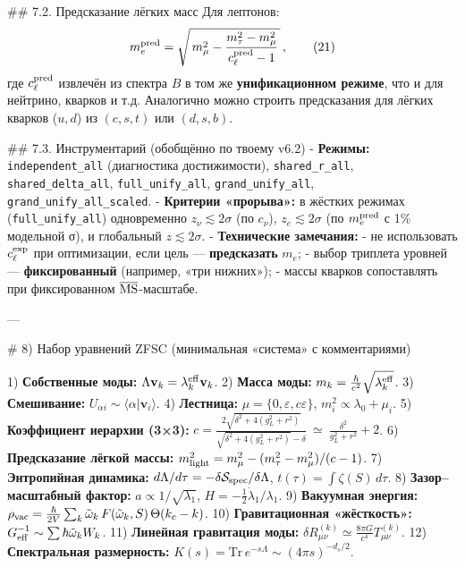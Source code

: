 \documentclass[12pt,a4paper]{article}
\begin{document}
## 7.2. Предсказание лёгких масс
Для лептонов:
\[
m_e^{\rm pred}=\sqrt{\,m_\mu^2-\frac{m_\tau^2-m_\mu^2}{c_\ell^{\rm pred}-1}\,}\,, \tag{21}
\]
где \(c_\ell^{\rm pred}\) извлечён из спектра \(B\) в том же \textbf{унификационном режиме}, что и для нейтрино, кварков и т.д. Аналогично можно строить предсказания для лёгких кварков (\(u,d\)) из \((c,s,t)\) или \((d,s,b)\).

## 7.3. Инструментарий (обобщённо по твоему v6.2)
- \textbf{Режимы:} \texttt{independent\_all} (диагностика достижимости), \texttt{shared\_r\_all}, \texttt{shared\_delta\_all}, \texttt{full\_unify\_all}, \texttt{grand\_unify\_all}, \texttt{grand\_unify\_all\_scaled}.  
- \textbf{Критерии «прорыва»:} в жёстких режимах (\texttt{full\_unify\_all}) одновременно  
  \(z_\nu\lesssim 2\sigma\) (по \(c_\nu\)), \(z_e\lesssim 2\sigma\) (по \(m_e^{\rm pred}\) с 1\% модельной σ), и глобальный \(z\lesssim 2\sigma\).
- \textbf{Технические замечания:}
  - не использовать \(c_\ell^{\rm exp}\) при оптимизации, если цель — \textbf{предсказать} \(m_e\);
  - выбор триплета уровней — \textbf{фиксированный} (например, «три нижних»);
  - массы кварков сопоставлять при фиксированном \(\overline{\rm MS}\)-масштабе.

---

\# 8) Набор уравнений ZFSC (минимальная «система» с комментариями)

1) \textbf{Собственные моды:} \(\Lambda \mathbf v_k=\lambda_k^{\rm eff}\mathbf v_k\).  
2) \textbf{Масса моды:} \(m_k=\frac{\hbar}{c^2}\sqrt{\lambda_k^{\rm eff}}\).  
3) \textbf{Смешивание:} \(U_{\alpha i}\sim\langle \alpha|\mathbf v_i\rangle\).  
4) \textbf{Лестница:} \(\mu=\{0,\varepsilon,c\varepsilon\}\), \(m_i^2\propto \lambda_0+\mu_i\).  
5) \textbf{Коэффициент иерархии (3×3):} \(c=\frac{2\sqrt{\delta^2+4(g_L^2+r^2)}}{\sqrt{\delta^2+4(g_L^2+r^2)}-\delta}\ \simeq\ \frac{\delta^2}{g_L^2+r^2}+2\).  
6) \textbf{Предсказание лёгкой массы:} \(m_{\rm light}^2=m_\mu^2-(m_\tau^2-m_\mu^2)/(c-1)\).  
7) \textbf{Энтропийная динамика:} \(d\Lambda/d\tau=-\delta \mathcal S_{\rm spec}/\delta\Lambda\), \(t(\tau)=\int \zeta(S)\,d\tau\).  
8) \textbf{Зазор–масштабный фактор:} \(a\propto 1/\sqrt{\lambda_1}\), \(H=-\tfrac{1}{2}\dot\lambda_1/\lambda_1\).  
9) \textbf{Вакуумная энергия:} \(\rho_{\rm vac}=\frac{\hbar}{2V}\sum_k \tilde\omega_k\,F(\tilde\omega_k,S)\,\Theta(k_c-k)\).  
10) \textbf{Гравитационная «жёсткость»:} \(G_{\rm eff}^{-1}\sim\sum \hbar\tilde\omega_k W_k\).  
11) \textbf{Линейная гравитация моды:} \(\delta R_{\mu\nu}^{(k)}\simeq \frac{8\pi G}{c^4}T_{\mu\nu}^{(k)}\).  
12) \textbf{Спектральная размерность:} \(K(s)=\mathrm{Tr}\,e^{-s\Lambda}\sim (4\pi s)^{-d_s/2}\).
\end{document}
